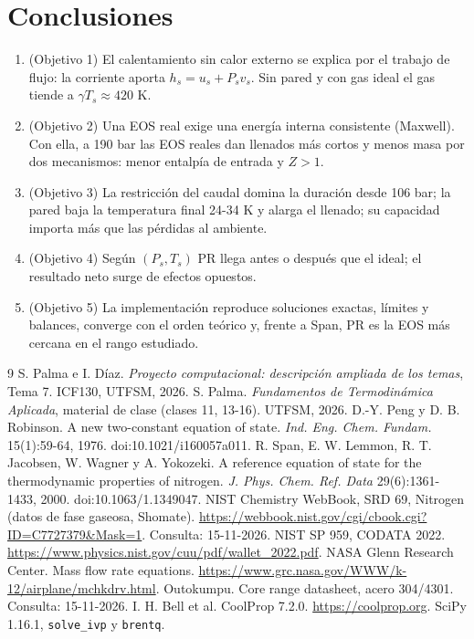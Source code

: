 \documentclass[11pt]{article}
\begin{document}
\section{Conclusiones}
\begin{enumerate}
\item (Objetivo 1) El calentamiento sin calor externo se explica por el trabajo de flujo: la corriente aporta $h_s=u_s+P_sv_s$.
Sin pared y con gas ideal el gas tiende a $\gamma T_s\approx420$ K.
\item (Objetivo 2) Una EOS real exige una energía interna consistente (Maxwell). Con ella, a 190 bar las EOS reales dan
llenados más cortos y menos masa por dos mecanismos: menor entalpía de entrada y $Z>1$.
\item (Objetivo 3) La restricción del caudal domina la duración desde 106 bar; la pared baja la temperatura final 24-34 K
y alarga el llenado; su capacidad importa más que las pérdidas al ambiente.
\item (Objetivo 4) Según $(P_s,T_s)$ PR llega antes o después que el ideal; el resultado neto surge de efectos opuestos.
\item (Objetivo 5) La implementación reproduce soluciones exactas, límites y balances, converge con el orden teórico y,
frente a Span, PR es la EOS más cercana en el rango estudiado.
\end{enumerate}

\begin{thebibliography}{9}
 S. Palma e I. Díaz. \emph{Proyecto computacional: descripción ampliada de los temas}, Tema 7. ICF130, UTFSM, 2026.
 S. Palma. \emph{Fundamentos de Termodinámica Aplicada}, material de clase (clases 11, 13-16). UTFSM, 2026.
 D.-Y. Peng y D. B. Robinson. A new two-constant equation of state. \emph{Ind. Eng. Chem. Fundam.} 15(1):59-64, 1976. doi:10.1021/i160057a011.
 R. Span, E. W. Lemmon, R. T. Jacobsen, W. Wagner y A. Yokozeki. A reference equation of state for the thermodynamic properties of nitrogen. \emph{J. Phys. Chem. Ref. Data} 29(6):1361-1433, 2000. doi:10.1063/1.1349047.
 NIST Chemistry WebBook, SRD 69, Nitrogen (datos de fase gaseosa, Shomate). \url{https://webbook.nist.gov/cgi/cbook.cgi?ID=C7727379&Mask=1}. Consulta: 15-11-2026.
 NIST SP 959, CODATA 2022. \url{https://www.physics.nist.gov/cuu/pdf/wallet_2022.pdf}.
 NASA Glenn Research Center. Mass flow rate equations. \url{https://www.grc.nasa.gov/WWW/k-12/airplane/mchkdrv.html}.
 Outokumpu. Core range datasheet, acero 304/4301. Consulta: 15-11-2026.
 I. H. Bell et al. CoolProp 7.2.0. \url{https://coolprop.org}. SciPy 1.16.1, \texttt{solve\_ivp} y \texttt{brentq}.
\end{thebibliography}
\end{document}
